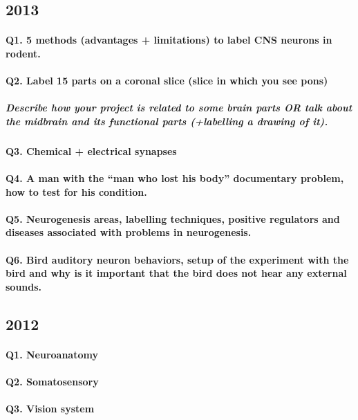 \documentclass[12pt,article,oneside,a4paper]{memoir}
\begin{document}
\subsection{2013}
\paragraph{Q1. 5 methods (advantages + limitations) to label CNS neurons in rodent.}
\paragraph{Q2. Label 15 parts on a coronal slice (slice in which you see pons)}
\subparagraph{Describe how your project is related to some brain parts OR talk about the midbrain and its functional parts (+labelling a drawing of it).}
\paragraph{Q3. Chemical + electrical synapses}
\paragraph{Q4. A man with the “man who lost his body” documentary problem, how to test for his condition.}
\paragraph{Q5. Neurogenesis areas, labelling techniques, positive regulators and diseases associated with problems in neurogenesis.}
\paragraph{Q6. Bird auditory neuron behaviors, setup of the experiment with the bird and why is it important that the bird does not hear any external sounds.}

\subsection{2012}
\paragraph{Q1. Neuroanatomy}
\paragraph{Q2. Somatosensory}
\paragraph{Q3. Vision system}
\end{document}
